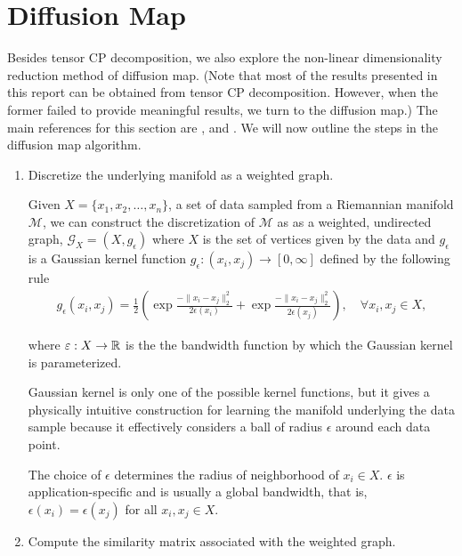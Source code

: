 \chapter{Diffusion Map} 
\label{appendix-diffmap} 

Besides tensor CP decomposition, we also explore the non-linear dimensionality reduction method of diffusion map. (Note that most of the results presented in this report can be obtained from tensor CP decomposition. However, when the former failed to provide meaningful results, we turn to the diffusion map.) The main references for this section are \cite{coifman_geometric_2005},   \cite{coifman_diffusion_2006} and \cite{stanley_geometric_2020}. We will now outline the steps in the diffusion map algorithm.
\begin{enumerate}
\item Discretize the underlying manifold as a weighted graph.
\begin{defn}

Given $X = \{x_1, x_2,\dots, x_n\}$, a set of data sampled from a Riemannian manifold $\mathcal{M}$, we can construct the discretization of $\mathcal{M}$ as as a weighted, undirected graph, $\mathcal{G}_X = (X, g_\epsilon)$ where $X$ is the set of vertices given by the data and $g_\epsilon$ is a Gaussian kernel function $g_\epsilon: (x_i, x_j) \to [0,\infty]$ defined by the following rule
\begin{align}
    g_\epsilon(x_i,x_j) = \frac{1}{2}\left(\exp{\frac{-\|x_i - x_j\|_2^2}{2\epsilon(x_i)}} + \exp{\frac{-\|x_i - x_j\|_2^2}{2\epsilon(x_j)}}\right), \quad \forall x_i,x_j \in X, 
\end{align}

 where $\varepsilon: X \to \mathbb R$ is the the bandwidth function by which the Gaussian kernel is parameterized. 
\end{defn}

Gaussian kernel is only one of the possible kernel functions, but it gives a physically intuitive construction for learning the manifold underlying the data sample because it effectively considers a ball of radius $\epsilon$ around each data point.

The choice of $\epsilon$ determines the radius of neighborhood of $x_i \in X$. $\epsilon$ is application-specific and is usually a global bandwidth, that is, $\epsilon(x_i) = \epsilon(x_j)$ for all $x_i, x_j \in X.$ 

\item Compute the similarity matrix associated with the weighted graph.


\end{enumerate}
